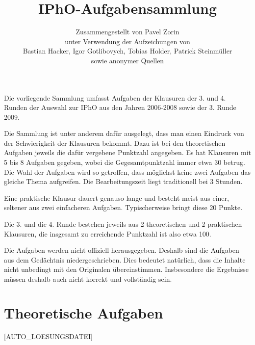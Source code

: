 \title{IPhO-Aufgabensammlung}
\author{Zusammengestellt von Pavel Zorin\\
unter Verwendung der Aufzeichungen von\\
Bastian Hacker, Igor Gotlibovych, Tobias Holder, Patrick Steinmüller\\
sowie anonymer Quellen}


\maketitle

Die vorliegende Sammlung umfasst Aufgaben der Klausuren der 3. und 4. Runden der Auswahl zur IPhO aus den Jahren 2006-2008 sowie der 3. Runde 2009.

Die Sammlung ist unter anderem dafür ausgelegt, dass man einen Eindruck von der Schwierigkeit der Klausuren bekommt. Dazu ist bei den theoretischen Aufgaben jeweils die dafür vergebene Punktzahl angegeben. Es hat Klausuren mit 5 bis 8 Aufgaben gegeben, wobei die Gegesamtpunktzahl immer etwa 30 betrug. Die Wahl der Aufgaben wird so getroffen, dass möglichst keine zwei Aufgaben das gleiche Thema aufgreifen. Die Bearbeitungszeit liegt traditionell bei 3 Stunden.

Eine praktische Klausur dauert genauso lange und besteht meist aus einer, seltener aus zwei einfacheren Aufgaben. Typischerweise bringt diese 20 Punkte.

Die 3. und die 4. Runde bestehen jeweils aus 2 theoretischen und 2 praktischen Klausuren, die insgesamt zu erreichende Punktzahl ist also etwa 100.

Die Aufgaben werden nicht offiziell herausgegeben. Deshalb sind die Aufgaben aus dem Gedächtnis niedergeschrieben. Dies bedeutet natürlich, dass die Inhalte nicht unbedingt mit den Originalen übereinstimmen. Insbesondere die Ergebnisse müssen deshalb auch nicht korrekt und vollständig sein.

\section*{Theoretische Aufgaben}

[AUTO_LOESUNGSDATEI]


















